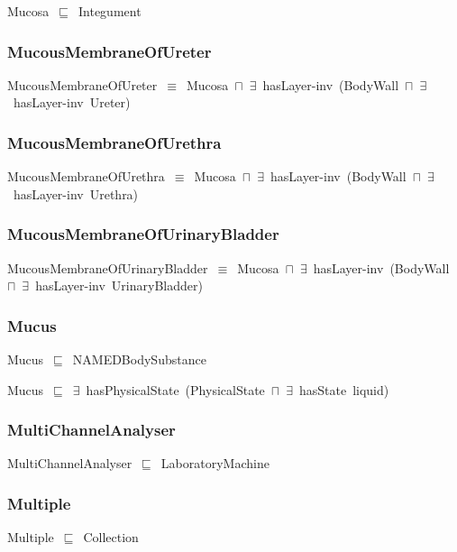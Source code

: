 \documentclass{article}
\begin{document}
Mucosa~\ensuremath{\sqsubseteq}~Integument~

\subsubsection*{MucousMembraneOfUreter}

MucousMembraneOfUreter~\ensuremath{\equiv}~Mucosa~\ensuremath{\sqcap}~\ensuremath{\exists}~hasLayer-inv~(BodyWall~\ensuremath{\sqcap}~\ensuremath{\exists}~hasLayer-inv~Ureter)

\subsubsection*{MucousMembraneOfUrethra}

MucousMembraneOfUrethra~\ensuremath{\equiv}~Mucosa~\ensuremath{\sqcap}~\ensuremath{\exists}~hasLayer-inv~(BodyWall~\ensuremath{\sqcap}~\ensuremath{\exists}~hasLayer-inv~Urethra)

\subsubsection*{MucousMembraneOfUrinaryBladder}

MucousMembraneOfUrinaryBladder~\ensuremath{\equiv}~Mucosa~\ensuremath{\sqcap}~\ensuremath{\exists}~hasLayer-inv~(BodyWall~\ensuremath{\sqcap}~\ensuremath{\exists}~hasLayer-inv~UrinaryBladder)

\subsubsection*{Mucus}

Mucus~\ensuremath{\sqsubseteq}~NAMEDBodySubstance~

Mucus~\ensuremath{\sqsubseteq}~\ensuremath{\exists}~hasPhysicalState~(PhysicalState~\ensuremath{\sqcap}~\ensuremath{\exists}~hasState~liquid)~

\subsubsection*{MultiChannelAnalyser}

MultiChannelAnalyser~\ensuremath{\sqsubseteq}~LaboratoryMachine~

\subsubsection*{Multiple}

Multiple~\ensuremath{\sqsubseteq}~Collection~
\end{document}

